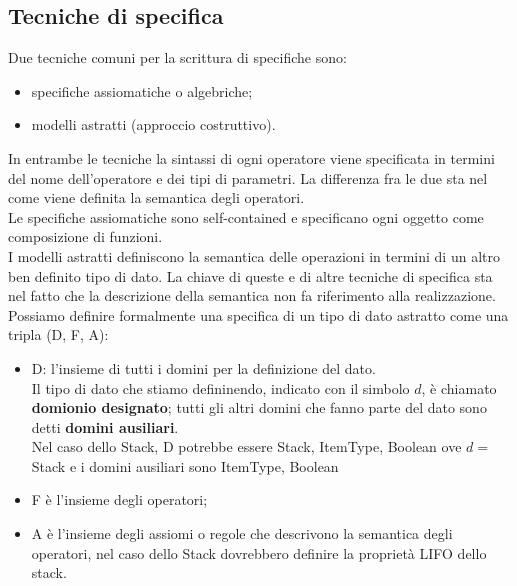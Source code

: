 \documentclass[12pt]{report}
\begin{document}
	\subsection{Tecniche di specifica}
	Due tecniche comuni per la scrittura di specifiche sono:
	\begin{itemize}
		\item specifiche assiomatiche o algebriche;
		\item modelli astratti (approccio costruttivo).
	\end{itemize}
	In entrambe le tecniche la sintassi di ogni operatore viene specificata in termini del nome dell'operatore e dei tipi di parametri. La differenza fra le due sta nel come viene definita la semantica degli operatori. \\
	Le specifiche assiomatiche sono self-contained e specificano ogni oggetto come composizione di funzioni. \\
	I modelli astratti definiscono la semantica delle operazioni in termini di un altro ben definito tipo di dato. La chiave di queste e di altre tecniche di specifica sta nel fatto che la descrizione della semantica non fa riferimento alla realizzazione. \\
	Possiamo definire formalmente una specifica di un tipo di dato astratto come una tripla (D, F, A):
	\begin{itemize}
		\item D: l'insieme di tutti i domini per la definizione del dato. \\
		Il tipo di dato che stiamo defininendo, indicato con il simbolo $d$, è chiamato \textbf{domionio designato}; tutti gli altri domini che fanno parte del dato sono detti \textbf{domini ausiliari}. \\
		Nel caso dello Stack, D potrebbe essere {Stack, ItemType, Boolean} ove $d=$Stack e i domini ausiliari sono {ItemType, Boolean}
		\item F è l'insieme degli operatori;
		\item A è l'insieme degli assiomi o regole che descrivono la semantica degli operatori, nel caso dello Stack dovrebbero definire la proprietà LIFO dello stack.
	\end{itemize}
\end{document}
